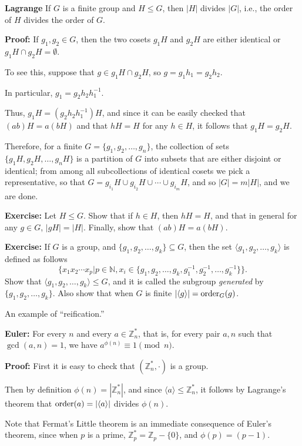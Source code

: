 \begin{frame}

{\bf Lagrange}
If $G$ is a finite group and $H\le G$, then $|H|$ divides $|G|$,
i.e., the order of $H$ divides the order of $G$.

{\bf Proof:}
If $g_1,g_2\in G$, then the two cosets $g_1H$ and $g_2H$ are either
identical or $g_1H\cap g_2H=\emptyset$.  

To see this, suppose that
$g\in g_1H\cap g_2H$, so $g=g_1h_1=g_2h_2$.  

In particular,
$g_1=g_2h_2h_1^{-1}$.  

Thus, $g_1H=(g_2h_2h_1^{-1})H$, and since it
can be easily checked that $(ab)H=a(bH)$ and that $hH=H$ for any $h\in
H$, it follows that $g_1H=g_2H$.

Therefore, for a finite $G=\{g_1,g_2,\ldots,g_n\}$, the collection of
sets $\{g_1H,g_2H,\ldots,g_nH\}$ is a partition of $G$ into subsets
that are either disjoint or identical; from among all subcollections
of identical cosets we pick a representative, so that $G=g_{i_1}H\cup
g_{i_2}H\cup\cdots\cup g_{i_m}H$, and so $|G|=m|H|$, and we are done.
\end{frame}

\begin{frame}

{\bf Exercise:}
Let $H\le G$.  Show that if $h\in H$, then $hH=H$, and that in general
for any $g\in G$, $|gH|=|H|$.  Finally, show that $(ab)H=a(bH)$.  

{\bf Exercise:}
If $G$ is a group, and $\{g_1,g_2,\ldots,g_k\}\subseteq G$, then the
set $\langle g_1,g_2,\ldots,g_k\rangle$ is defined as follows
$$
\{x_1x_2\cdots x_p|p\in\mathbb{N},
x_i\in\{g_1,g_2,\ldots,g_k,g_1^{-1},g_2^{-1},\ldots,g_k^{-1}\}\}.
$$
Show that $\langle g_1,g_2,\ldots,g_k\rangle\le G$, and it is
called the subgroup {\em generated} by $\{g_1,g_2,\ldots,g_k\}$.  Also
show that when $G$ is finite $|\langle g\rangle|=\mathrm{order}_G(g)$.
\end{frame}

\begin{frame}

An example of ``reification.''

{\bf Euler:}
For every $n$ and every $a\in\mathbb{Z}_n^*$, that is, for every pair
$a,n$ such that $\gcd(a,n)=1$, we have
$a^{\phi(n)}\equiv 1\pmod n$.  

{\bf Proof:}
First it is easy to check that $(\mathbb{Z}_n^*,\cdot)$ is a group.

Then by definition $\phi(n)=|\mathbb{Z}_n^*|$, and since $\langle
a\rangle\le\mathbb{Z}_n^*$, it follows by Lagrange's theorem that
$\mathrm{order}(a)=|\langle a\rangle|$ divides $\phi(n)$.

Note that Fermat's Little theorem
is an immediate consequence of
Euler's theorem, since when $p$ is a prime,
$\mathbb{Z}_p^*=\mathbb{Z}_p-\{0\}$, and $\phi(p)=(p-1)$.

\end{frame}

